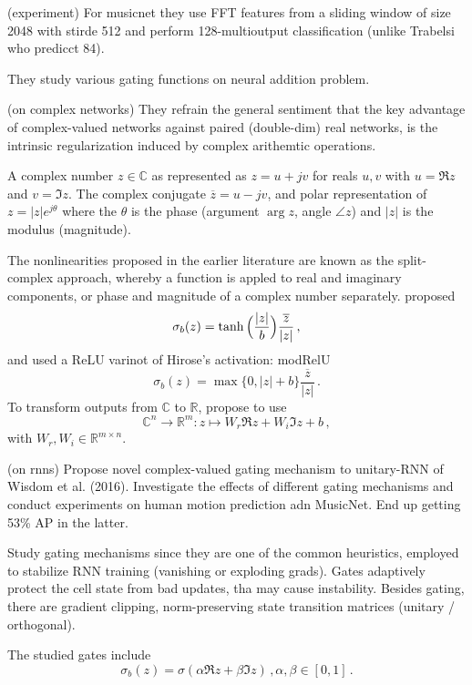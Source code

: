 (experiment)
For musicnet they use FFT features from a sliding window of size 2048 with stirde
512 and perform 128-multioutput classification (unlike Trabelsi who predicct 84).

They study various gating functions on neural addition problem.

(on complex networks)
They refrain the general sentiment that the key advantage of complex-valued networks
against paired (double-dim) real networks, is the intrinsic regularization induced by
complex arithemtic operations.

A complex number $z\in \mathbb{C}$ as represented as $z = u + j v$ for reals $u, v$
with $u = \Re z$ and $v = \Im z$. The complex conjugate $\overline{z} = u - j v$, and
polar representation of $z = \lvert z \rvert e^{j \theta}$ where the $\theta$ is the
phase (argument $\arg z$, angle $\angle z$) and $\lvert z \rvert$ is the modulus
(magnitude).

The nonlinearities proposed in the earlier literature are known as the split-complex
approach, whereby a function is appled to real and imaginary components, or phase and
magnitude of a complex number separately. \citet{hirose_complex_2009} proposed 
$$
\sigma_b(z)
    = \tanh{\Bigl(\frac{\lvert z \rvert}{b}\Bigr)}
        \frac{\overline{z}}{\lvert z \rvert}  %
\,, $$
and \citet{arjovsky_unitary_2016} used a ReLU varinot of Hirose's activation: modRelU
$$
\sigma_b(z)
    = \max{\bigl\{0, \lvert z \rvert + b\bigr\}}
        \frac{\overline{z}}{\lvert z \rvert}
\,. $$
To transform outputs from $\mathbb{C}$ to $\mathbb{R}$, \citet{wolter_complex_2018}
propose to use
$$
\mathbb{C}^n \to \mathbb{R}^m
    \colon z \mapsto W_r \Re z + W_i \Im z + b
    \,, $$
with $W_r, W_i \in \mathbb{R}^{m \times n}$.


(on rnns)
Propose novel complex-valued gating mechanism to unitary-RNN of Wisdom et al. (2016).
Investigate the effects of different gating mechanisms and conduct experiments on human
motion prediction adn MusicNet. End up getting 53\% AP in the latter.

Study gating mechanisms since they are one of the common heuristics, employed to
stabilize RNN training (vanishing or exploding grads). Gates adaptively protect the
cell state from bad updates, tha may cause instability. Besides gating, there are
gradient clipping, norm-preserving state transition matrices (unitary / orthogonal).

The studied gates include 
$$
\sigma_b(z)
    = \sigma(\alpha \Re z + \beta \Im z)
    \,, \alpha,\beta \in [0, 1] 
\,. $$

